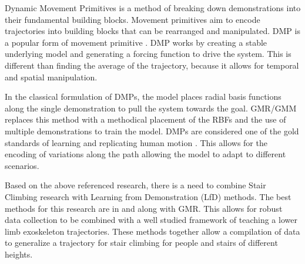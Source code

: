 Dynamic Movement Primitives is a method of breaking down demonstrations into their fundamental building blocks. Movement primitives aim to encode trajectories into building blocks that can be rearranged and manipulated. DMP is a popular form of movement primitive \cite{ijspeert2013dynamical}. DMP works by creating a stable underlying model and generating a forcing function to drive the system. This is different than finding the average of the trajectory, because it allows for temporal and spatial manipulation. 

In the classical formulation of DMPs, the model places radial basis functions along the single demonstration to pull the system towards the goal. GMR/GMM replaces this method with a methodical placement of the RBFs and the use of multiple demonstrations to train the model. DMPs are considered one of the gold standards of learning and replicating human motion \cite{nakanishi2004learning}. This allows for the encoding of variations along the path allowing the model to adapt to different scenarios. 

Based on the above referenced research, there is a need to combine Stair Climbing research with Learning from Demonstration (LfD) methods. The best methods for this research are in \cite{andriacchi1980study} and \cite{hicks2011lower} along with GMR. This allows for robust data collection to be combined with a well studied framework of teaching a lower limb exoskeleton trajectories. These methods together allow a compilation of data to generalize a trajectory for stair climbing for people and stairs of different heights.